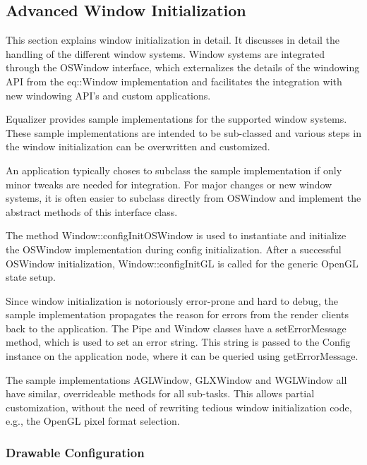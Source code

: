 \documentclass[10pt,a4]{scrartcl}
\begin{document}
\subsection{Advanced Window Initialization}

This section explains window initialization in detail. It discusses in
detail the handling of the different window systems. Window systems are
integrated through the \textsf{OSWindow} interface, which externalizes
the details of the windowing API from the \textsf{eq::Window}
implementation and facilitates the integration with new windowing API's
and custom applications.

Equalizer provides sample implementations for the supported window
systems. These sample implementations are intended to be sub-classed and
various steps in the window initialization can be overwritten and
customized.

An application typically choses to subclass the sample implementation if
only minor tweaks are needed for integration. For major changes or new
window systems, it is often easier to subclass directly from
\textsf{OSWindow} and implement the abstract methods of this interface
class.

The method \textsf{Window::configInitOSWindow} is used to instantiate
and initialize the \textsf{OSWindow} implementation during config
initialization. After a successful \textsf{OSWindow} initialization,
\textsf{Window::configInitGL} is called for the generic OpenGL state
setup.

Since window initialization is notoriously error-prone and hard to
debug, the sample implementation propagates the reason for errors
from the render clients back to the application. The \textsf{Pipe} and
\textsf{Window} classes have a \textsf{setErrorMessage} method, which is
used to set an error string. This string is passed to the
\textsf{Config} instance on the application node, where it can be
queried using \textsf{getErrorMessage}.

The sample implementations \textsf{AGLWindow}, \textsf{GLXWindow} and
\textsf{WGLWindow} all have similar, overrideable methods for all
sub-tasks. This allows partial customization, without the need of
rewriting tedious window initialization code, e.g., the OpenGL pixel
format selection.

\subsubsection{\label{sDrawableConfig}Drawable Configuration}
\end{document}
